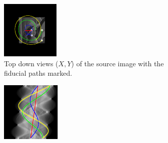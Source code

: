 \begin{figure}
  \centering
  \hfill
  \begin{subfigure}[t]{0.3\textwidth}
    \includegraphics[width=\textwidth]{Chapters/flopt/Figs/PDF/results/helix/topdown_bead_paths}
    \caption{Top down views (\(X,Y\)) of the source image with the fiducial paths marked.}
    \label{fig:topdown_bead_paths}
  \end{subfigure}\hfill
  \begin{subfigure}[t]{0.3\textwidth}
    \includegraphics[width=\textwidth]{Chapters/flopt/Figs/PDF/results/helix/sinugram_stretch}

\end{subfigure}
\end{figure}
